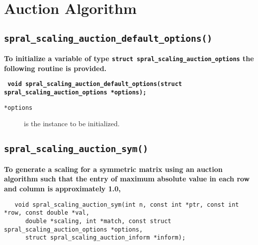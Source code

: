 

\section{Auction Algorithm}

\subsection{\texttt{spral\_scaling\_auction\_default\_options()}}

\textbf{To initialize a variable of type
   \texttt{struct spral\_scaling\_auction\_options} the following routine
   is provided.}

\vspace*{0.3cm}
\noindent
\textbf{\texttt{
   \hspace*{0.3cm} void spral\_scaling\_auction\_default\_options(struct spral\_scaling\_auction\_options *options);
}}
\vspace*{-0.4cm}

\begin{description}
   \item[\texttt{*options}] is the instance to be initialized.
\end{description}


\subsection{\texttt{spral\_scaling\_auction\_sym()}}

\textbf{\noindent
   To generate a scaling for a symmetric matrix using an auction algorithm such that the entry of maximum absolute value in each row and column is approximately 1.0,
}
\vspace*{-0.1cm}
\begin{verbatim}
   void spral_scaling_auction_sym(int n, const int *ptr, const int *row, const double *val,
      double *scaling, int *match, const struct spral_scaling_auction_options *options,
      struct spral_scaling_auction_inform *inform);
\end{verbatim}

